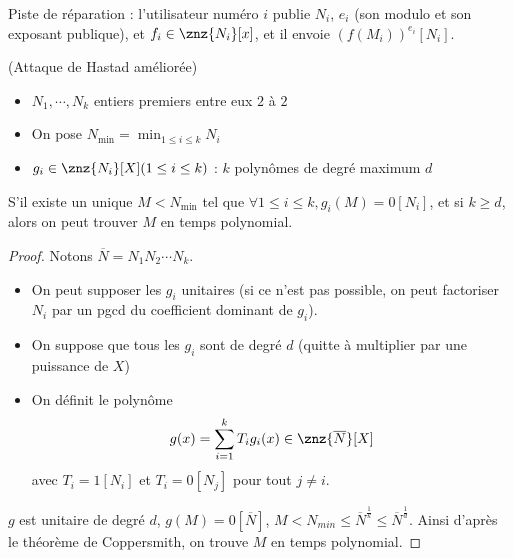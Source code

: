            Piste de réparation : l'utilisateur numéro $i$ publie $N_i$, $e_i$ (son modulo et son exposant publique), et $f_i \in \znz{N_i}[x]$, et il envoie $(f(M_i))^{e_i} [N_i]$. 
            \begin{theo} (Attaque de Hastad améliorée)
                \begin{itemize}
                    \item $N_1, \cdots, N_k$ entiers premiers entre eux $2$ à $2$
                    \item On pose $N_{\min} = \min_{1 \leq i \leq k} N_i$
                    \item $g_i \in \znz{N_i} [X] (1 \leq i \leq k)$ : $k$ polynômes de degré maximum $d$
                \end{itemize}
                S'il existe un unique $M < N_{\min}$ tel que $\forall 1 \leq i \leq k, g_i(M) = 0 [N_i]$, et si $k \geq d$, alors on peut trouver $M$ en temps polynomial.
            \end{theo}
            \begin{proof}
                Notons $\overline{N} = N_1N_2 \cdots N_k$.
                \begin{itemize}
                    \item On peut supposer les $g_i$ unitaires (si ce n'est pas possible, on peut factoriser $N_i$ par un pgcd du coefficient dominant de $g_i$).
                    \item On suppose que tous les $g_i$ sont de degré $d$ (quitte à multiplier par une puissance de $X$)
                    \item On définit le polynôme
                    \begin{align*}
                        g(x) = \sum_{i = 1}^k T_i g_i(x) \in \znz{\overline{N}}[X]
                    \end{align*}
                    avec $T_i = 1 [N_i]$ et $T_i = 0 [N_j]$ pour tout $j \neq i$.
                \end{itemize}
                $g$ est unitaire de degré $d$, $g(M) = 0 [\overline{N}]$, $M < N_{min} \leq \overline{N}^{\frac 1k} \leq \overline{N}^{\frac 1d}$. Ainsi d'après le théorème de Coppersmith, on trouve $M$ en temps polynomial. 
            \end{proof}

